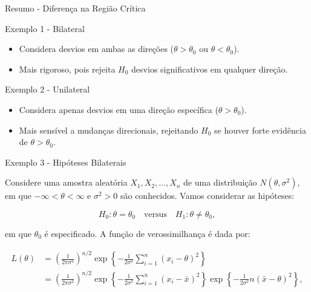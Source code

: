 \documentclass[12pt]{beamer}
\begin{document}
\begin{frame}{Resumo - Diferença na Região Crítica}
	\begin{block}{Exemplo 1 - Bilateral}
		\justifying
		\begin{itemize}
			\justifying
			\item Considera desvios em ambas as direções (\(\theta > \theta_{0}\) ou \(\theta < \theta_{0}\)).
			\item Mais rigoroso, pois rejeita \(H_0\) desvios significativos em qualquer direção.
		\end{itemize}
	\end{block}
	\begin{block}{Exemplo 2 - Unilateral}
		\justifying
		\begin{itemize}
			\item Considera apenas desvios em uma direção específica (\(\theta > \theta_{0}\)).
			\item Mais sensível a mudanças direcionais, rejeitando \(H_0\) se houver forte evidência de \(\theta > \theta_{0}\).
		\end{itemize}
	\end{block}
\end{frame}

\begin{frame}{Exemplo 3 - Hipóteses Bilaterais}
	\begin{block}{}
		\justifying
		Considere uma amostra aleatória $X_1, X_2, \ldots, X_n$ de uma distribuição $N(\theta, \sigma^2)$, em que $-\infty < \theta < \infty$ e $\sigma^2 > 0$ são conhecidos. Vamos considerar as hipóteses:
		
		\[ H_0 : \theta = \theta_0 \quad \text{versus} \quad H_1 : \theta \neq \theta_0, \]
		
		em que $\theta_0$ é especificado. A função de verossimilhança é dada por:
		
		
		\begin{align}
			L(\theta) &= \left(\frac{1}{2\pi\sigma^2}\right)^{n/2} \exp\left\{ -\frac{1}{2\sigma^2} \sum_{i=1}^{n}(x_i - \theta)^2 \right\} \\
			&= \left(\frac{1}{2\pi\sigma^2}\right)^{n/2} \exp\left\{ -\frac{1}{2\sigma^2} \sum_{i=1}^{n}(x_i - \bar{x})^2 \right\} \exp\left\{ -\frac{1}{2\sigma^2}n(\bar{x} - \theta)^2 \right\},
		\end{align}
		
	\end{block}
\end{frame}
\end{document}
